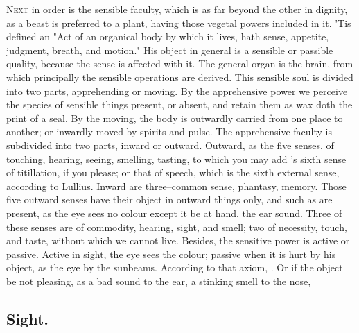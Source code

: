 \lettrine{N}{ext} in order is the sensible faculty, which is as far beyond the
other in dignity, as a beast is preferred to a plant, having those vegetal
powers included in it. 'Tis defined an "Act of an organical body by which it
lives, hath sense, appetite, judgment, breath, and motion." His object in
general is a sensible or passible quality, because the sense is affected with
it. The general organ is the brain, from which principally the sensible
operations are derived. This sensible soul is divided into two parts,
apprehending or moving. By the apprehensive power we perceive the species of
sensible things present, or absent, and retain them as wax doth the print of a
seal. By the moving, the body is outwardly carried from one place to another;
or inwardly moved by spirits and pulse. The apprehensive faculty is subdivided
into two parts, inward or outward. Outward, as the five senses, of touching,
hearing, seeing, smelling, tasting, to which you may add \Scaliger{}'s sixth sense
of titillation, if you please; or that of speech, which is the sixth external
sense, according to Lullius. Inward are three--common sense, phantasy, memory.
Those five outward senses have their object in outward things only, and such as
are present, as the eye sees no colour except it be at hand, the ear sound.
Three of these senses are of commodity, hearing, sight, and smell; two of
necessity, touch, and taste, without which we cannot live. Besides, the
sensitive power is active or passive. Active in sight, the eye sees the colour;
passive when it is hurt by his object, as the eye by the sunbeams. According to
that axiom, . Or if
the object be not pleasing, as a bad sound to the ear, a stinking smell to the
nose, \etc{}

\subsection{Sight.}

